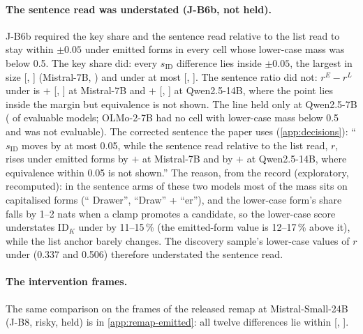 \paragraph{The sentence read was understated (J-B6b, not held).} J-B6b required the key share and the sentence read relative to the list read to stay within $\pm 0.05$ under emitted forms in every cell whose lower-case mass was below 0.5. The key share did: every $s_{\mathrm{ID}}$ difference lies inside $\pm 0.05$, the largest in size \JbSixbSidNoneMistralSeven{} [\JbSixbSidNoneMistralSevenLo{}, \JbSixbSidNoneMistralSevenHi{}] (Mistral-7B, \fmtNone{}) and under \fmtPost{} at most \JbSixbSidPostMistralSeven{} [\JbSixbSidPostMistralSevenLo{}, \JbSixbSidPostMistralSevenHi{}]. The sentence ratio did not: $r^E - r^L$ under \fmtPost{} is $+$\JbSixbRPostMistralSeven{} [\JbSixbRPostMistralSevenLo{}, \JbSixbRPostMistralSevenHi{}] at Mistral-7B and $+$\JbSixbRPostQwenFourteen{} [\JbSixbRPostQwenFourteenLo{}, \JbSixbRPostQwenFourteenHi{}] at Qwen2.5-14B, where the point lies inside the margin but equivalence is not shown. The line held only at Qwen2.5-7B (\JbSixbMet{} of \JbSixbEval{} evaluable models; OLMo-2-7B had no cell with lower-case mass below 0.5 and was not evaluable). The corrected sentence the paper uses (\cref{app:decisions}): ``$s_{\mathrm{ID}}$ moves by at most 0.05, while the sentence read relative to the list read, $r$, rises under emitted forms by $+$\JbSixbRPostMistralSeven{} at Mistral-7B and by $+$\JbSixbRPostQwenFourteen{} at Qwen2.5-14B, where equivalence within 0.05 is not shown.'' The reason, from the record (exploratory, recomputed): in the sentence arms of these two models most of the mass sits on capitalised forms (`` Drawer'', ``Draw'' + ``er''), and the lower-case form's share falls by 1--2 nats when a clamp promotes a candidate, so the lower-case score understates $\mathrm{ID}_K$ under \fmtPost{} by 11--15\,\% (the emitted-form value is 12--17\,\% above it), while the list anchor barely changes. The discovery sample's lower-case values of $r$ under \fmtPost{} (0.337 and 0.506) therefore understated the sentence read. %

\paragraph{The intervention frames.} The same comparison on the frames of the released remap at Mistral-Small-24B (J-B8, risky, held) is in \cref{app:remap-emitted}: all twelve differences lie within [\JbEightLoMin{}, \JbEightHiMax{}].

